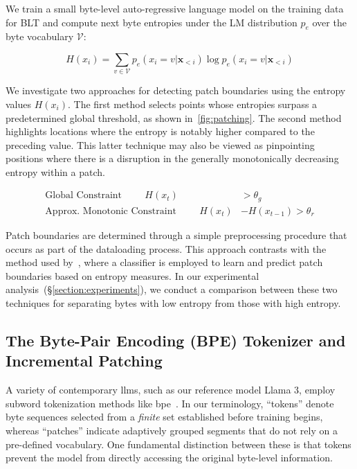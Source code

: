 We train a small byte-level auto-regressive language model on the training data for {\textsc BLT} and compute next byte entropies under the LM distribution $p_{e}$ over the byte vocabulary $\mathcal{V}$:

\begin{equation}
H(x_i) = \sum_{v \in \mathcal{V}} p_{e}(x_i=v|\pmb{x}_{<i}) \log p_{e}(x_i=v|\pmb{x}_{<i})
\end{equation}

We investigate two approaches for detecting patch boundaries using the entropy values $H(x_i)$. The first method selects points whose entropies surpass a predetermined global threshold, as shown in~\autoref{fig:patching}. The second method highlights locations where the entropy is notably higher compared to the preceding value. This latter technique may also be viewed as pinpointing positions where there is a disruption in the generally monotonically decreasing entropy within a patch.

\begin{align*}
    \text{Global Constraint}\hspace{1cm}H(x_t)& > \theta_g\\
    \text{Approx. Monotonic Constraint}\hspace{1cm}H(x_t)& - H(x_{t-1}) > \theta_r
\end{align*}

Patch boundaries are determined through a simple preprocessing procedure that occurs as part of the dataloading process. This approach contrasts with the method used by~\citet{nawrot-etal-2023-efficient}, where a classifier is employed to learn and predict patch boundaries based on entropy measures. In our experimental analysis~(\S\ref{section:experiments}), we conduct a comparison between these two techniques for separating bytes with low entropy from those with high entropy.

\subsection{The Byte-Pair Encoding (BPE) Tokenizer and Incremental Patching}
\label{section:incremental-patching}
\label{section:bpe-patch}

A variety of contemporary llms, such as our reference model Llama 3, employ subword tokenization methods like bpe~\citep{gage1994new, sennrich-etal-2016-neural}. In our terminology, ``tokens'' denote byte sequences selected from a \textit{finite} set established before training begins, whereas ``patches'' indicate adaptively grouped segments that do not rely on a pre-defined vocabulary. One fundamental distinction between these is that tokens prevent the model from directly accessing the original byte-level information.

